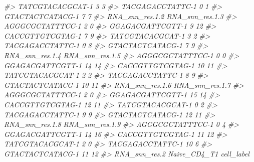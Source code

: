 \documentclass[
]{book}
\newenvironment{Shaded}{\begin{snugshade}}{\end{snugshade}}
\newcommand{\CommentTok}[1]{\textcolor[rgb]{0.56,0.35,0.01}{\textit{#1}}}
\begin{document}
\begin{Shaded}
\begin{Highlighting}[]
\CommentTok{\#\textgreater{} TATCGTACACGCAT{-}1             3               3}
\CommentTok{\#\textgreater{} TACGAGACCTATTC{-}1             0               1}
\CommentTok{\#\textgreater{} GTACTACTCATACG{-}1             7               7}
\CommentTok{\#\textgreater{}                  RNA\_snn\_res.1.2 RNA\_snn\_res.1.3}
\CommentTok{\#\textgreater{} AGGGCGCTATTTCC{-}1               2               0}
\CommentTok{\#\textgreater{} GGAGACGATTCGTT{-}1               9              12}
\CommentTok{\#\textgreater{} CACCGTTGTCGTAG{-}1               7               9}
\CommentTok{\#\textgreater{} TATCGTACACGCAT{-}1               3               2}
\CommentTok{\#\textgreater{} TACGAGACCTATTC{-}1               0               8}
\CommentTok{\#\textgreater{} GTACTACTCATACG{-}1               7               9}
\CommentTok{\#\textgreater{}                  RNA\_snn\_res.1.4 RNA\_snn\_res.1.5}
\CommentTok{\#\textgreater{} AGGGCGCTATTTCC{-}1               0               0}
\CommentTok{\#\textgreater{} GGAGACGATTCGTT{-}1              14              14}
\CommentTok{\#\textgreater{} CACCGTTGTCGTAG{-}1              10              11}
\CommentTok{\#\textgreater{} TATCGTACACGCAT{-}1               2               2}
\CommentTok{\#\textgreater{} TACGAGACCTATTC{-}1               8               9}
\CommentTok{\#\textgreater{} GTACTACTCATACG{-}1              10              11}
\CommentTok{\#\textgreater{}                  RNA\_snn\_res.1.6 RNA\_snn\_res.1.7}
\CommentTok{\#\textgreater{} AGGGCGCTATTTCC{-}1               2               0}
\CommentTok{\#\textgreater{} GGAGACGATTCGTT{-}1              15              14}
\CommentTok{\#\textgreater{} CACCGTTGTCGTAG{-}1              12              11}
\CommentTok{\#\textgreater{} TATCGTACACGCAT{-}1               0               2}
\CommentTok{\#\textgreater{} TACGAGACCTATTC{-}1               9               9}
\CommentTok{\#\textgreater{} GTACTACTCATACG{-}1              12              11}
\CommentTok{\#\textgreater{}                  RNA\_snn\_res.1.8 RNA\_snn\_res.1.9}
\CommentTok{\#\textgreater{} AGGGCGCTATTTCC{-}1               0               4}
\CommentTok{\#\textgreater{} GGAGACGATTCGTT{-}1              14              16}
\CommentTok{\#\textgreater{} CACCGTTGTCGTAG{-}1              11              12}
\CommentTok{\#\textgreater{} TATCGTACACGCAT{-}1               2               0}
\CommentTok{\#\textgreater{} TACGAGACCTATTC{-}1              10               6}
\CommentTok{\#\textgreater{} GTACTACTCATACG{-}1              11              12}
\CommentTok{\#\textgreater{}                  RNA\_snn\_res.2 Naive\_CD4\_T1  cell\_label}

\end{Highlighting}
\end{Shaded}
\end{document}
